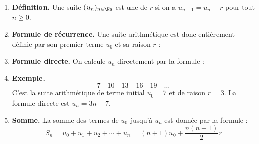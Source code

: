 \documentclass[11pt,class=report,crop=false]{standalone}
\begin{document}




\begin{cours}




\begin{enumerate}
  \item \textbf{Définition.} Une suite $(u_n)_{n\in\Nn}$ est une  de  $r$ si on a $u_{n+1} = u_n + r$ pour tout $n\ge0$.
  

  
  \item \textbf{Formule de récurrence.} Une suite arithmétique est donc entièrement définie par son premier terme $u_0$ et sa raison $r$ :
  


  
  \item \textbf{Formule directe.} On calcule $u_n$ directement par la formule :
  
  
  \item \textbf{Exemple.}
  $$7 \quad 10 \quad 13 \quad 16 \quad 19 \quad \ldots$$
  C'est la suite arithmétique de terme initial $u_0 = 7$ et de raison $r=3$.
  La formule directe est $u_n = 3n + 7$.
  
  \item \textbf{Somme.} La somme des termes de $u_0$ jusqu'à $u_n$ est donnée par la formule :
  $$S_n = u_0 + u_1 + u_2 + \cdots + u_n = (n+1)u_0+ \frac{n(n+1)}{2}r$$
\end{enumerate}  
\end{cours}
\end{document}
